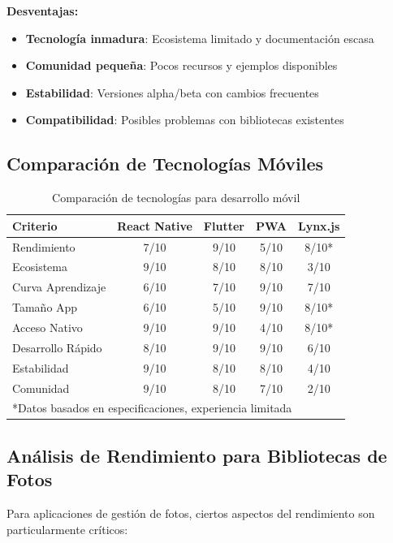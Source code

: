 \textbf{Desventajas:}
\begin{itemize}
    \item \textbf{Tecnología inmadura}: Ecosistema limitado y documentación escasa
    \item \textbf{Comunidad pequeña}: Pocos recursos y ejemplos disponibles
    \item \textbf{Estabilidad}: Versiones alpha/beta con cambios frecuentes
    \item \textbf{Compatibilidad}: Posibles problemas con bibliotecas existentes
\end{itemize}

\subsection{Comparación de Tecnologías Móviles}

\begin{table}[H]
\centering
\begin{tabular}{|l|c|c|c|c|}
\hline
\textbf{Criterio} & \textbf{React Native} & \textbf{Flutter} & \textbf{PWA} & \textbf{Lynx.js} \\
\hline
Rendimiento & 7/10 & 9/10 & 5/10 & 8/10* \\
Ecosistema & 9/10 & 8/10 & 8/10 & 3/10 \\
Curva Aprendizaje & 6/10 & 7/10 & 9/10 & 7/10 \\
Tamaño App & 6/10 & 5/10 & 9/10 & 8/10* \\
Acceso Nativo & 9/10 & 9/10 & 4/10 & 8/10* \\
Desarrollo Rápido & 8/10 & 9/10 & 9/10 & 6/10 \\
Estabilidad & 9/10 & 8/10 & 8/10 & 4/10 \\
Comunidad & 9/10 & 8/10 & 7/10 & 2/10 \\
\hline
\multicolumn{5}{|l|}{*Datos basados en especificaciones, experiencia limitada} \\
\hline
\end{tabular}
\caption{Comparación de tecnologías para desarrollo móvil}
\label{tab:mobile_tech_comparison}
\end{table}

\subsection{Análisis de Rendimiento para Bibliotecas de Fotos}

Para aplicaciones de gestión de fotos, ciertos aspectos del rendimiento son particularmente críticos:

